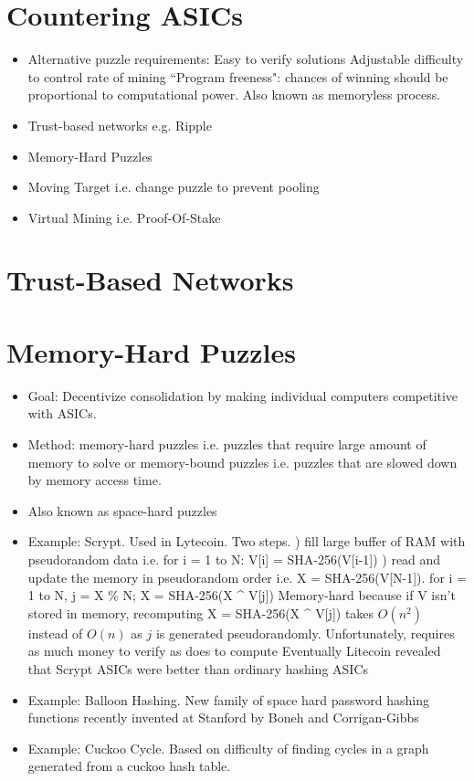 \documentclass{article}
\begin{document}
\section{Countering ASICs}
\begin{itemize}
\item Alternative puzzle requirements:
\subitem Easy to verify solutions
\subitem Adjustable difficulty to control rate of mining
\subitem ``Program freeness": chances of winning should be proportional to computational power. Also known as memoryless process.
\item Trust-based networks e.g. Ripple
\item Memory-Hard Puzzles
\item Moving Target i.e. change puzzle to prevent pooling
\item Virtual Mining i.e. Proof-Of-Stake
\end{itemize}

\section{Trust-Based Networks}

\section{Memory-Hard Puzzles}
\begin{itemize}
\item Goal: Decentivize consolidation by making individual computers competitive with ASICs.
\item Method: memory-hard puzzles i.e. puzzles that require large amount of memory to solve or memory-bound puzzles i.e. puzzles that are slowed down by memory access time.
\item Also known as space-hard puzzles
\item Example: Scrypt. Used in Lytecoin. Two steps. 
) fill large buffer of RAM with pseudorandom data i.e. for i = 1 to N: V[i] = SHA-256(V[i-1])
) read and update the memory in pseudorandom order i.e. X = SHA-256(V[N-1]). for i = 1 to N, {j = X \% N; X = SHA-256(X \string^ V[j])}
\subitem Memory-hard because if V isn't stored in memory, recomputing X = SHA-256(X \string^ V[j]) takes $O(n^2)$ instead of $O(n)$ as $j$ is generated pseudorandomly.
\subitem Unfortunately, requires as much money to verify as does to compute
\subitem Eventually Litecoin revealed that Scrypt ASICs were better than ordinary hashing ASICs
\item Example: Balloon Hashing. New family of space hard password hashing functions recently invented at Stanford by Boneh and Corrigan-Gibbs
\item Example: Cuckoo Cycle. Based on difficulty of finding cycles in a graph generated from a cuckoo hash table.
\end{itemize}
\end{document}
